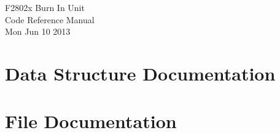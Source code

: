 \documentclass{book}
\begin{document}
\hypersetup{pageanchor=false,citecolor=blue}
\begin{titlepage}
\vspace*{7cm}
\begin{center}
{\Large F2802x Burn In Unit}\\
\vspace*{1cm}
{\large Code Reference Manual}\\
\vspace*{0.5cm}
{\small Mon Jun 10 2013}\\
\end{center}
\end{titlepage}
\clearemptydoublepage
{}
\tableofcontents
\clearemptydoublepage
{}
\hypersetup{pageanchor=true,citecolor=blue}
\chapter{Data Structure Documentation}


\chapter{File Documentation}















\printindex
\end{document}
